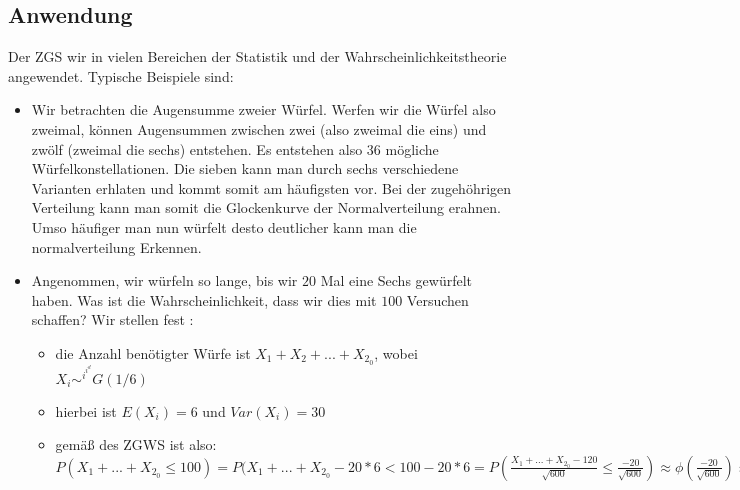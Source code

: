 \documentclass{article}
\begin{document}
\subsection{Anwendung}
Der ZGS wir in vielen Bereichen der Statistik und der Wahrscheinlichkeitstheorie angewendet. Typische Beispiele sind:
\begin{itemize}
\item Wir betrachten die Augensumme zweier Würfel. Werfen wir die Würfel also zweimal, können Augensummen zwischen zwei (also zweimal die eins) und zwölf (zweimal die sechs) entstehen. Es entstehen also $36$ mögliche Würfelkonstellationen. Die sieben kann man durch sechs verschiedene Varianten erhlaten und kommt somit am häufigsten vor. Bei der zugehöhrigen Verteilung kann man somit die Glockenkurve der Normalverteilung erahnen. Umso häufiger man nun würfelt desto deutlicher kann man die normalverteilung Erkennen. 
    \item Angenommen, wir würfeln so lange, bis wir $20$ Mal eine Sechs gewürfelt haben. Was ist die Wahrscheinlichkeit, dass wir dies mit $100$ Versuchen schaffen?
    Wir stellen fest \cite{Statistik}:
    \begin{itemize}
        \item die Anzahl benötigter Würfe ist $X_1+X_2+...+X_2_0$, wobei $X_i \sim^i^i^d G(1/6)$
        \item hierbei ist $E(X_i)=6$ und $Var(X_i)=30$
        \item gemäß des ZGWS ist also: 
        $P(X_1+...+X_2_0\leq100)=P(X_1+...+X_2_0-20*6<100-20*6=P(\frac{X_1+...+X_2_0 -120}{\sqrt{600}}\leq\frac{-20}{\sqrt{600}})\approx\phi(\frac{-20}{\sqrt{600}})\approx 0.21$
        
    \end{itemize}
\end{itemize}
\end{document}
